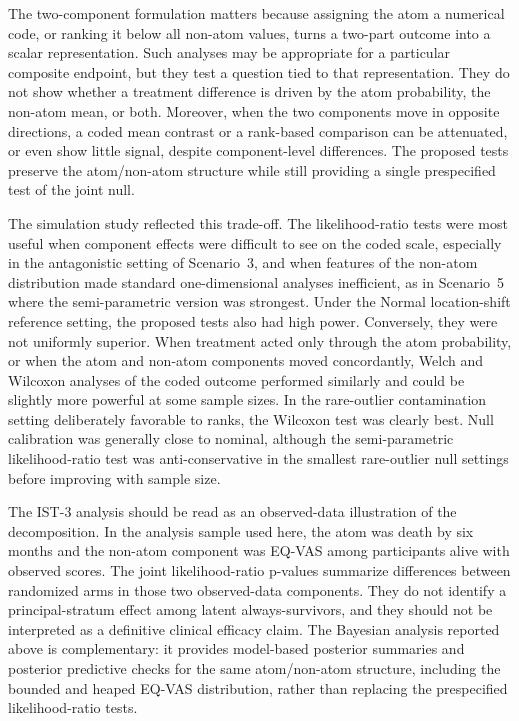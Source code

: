 \documentclass[11pt]{article}
\begin{document}
The two-component formulation matters because assigning the atom a numerical code, or ranking it below all non-atom values, turns a two-part outcome into a scalar representation. Such analyses may be appropriate for a particular composite endpoint, but they test a question tied to that representation. They do not show whether a treatment difference is driven by the atom probability, the non-atom mean, or both. Moreover, when the two components move in opposite directions, a coded mean contrast or a rank-based comparison can be attenuated, or even show little signal, despite component-level differences. The proposed tests preserve the atom/non-atom structure while still providing a single prespecified test of the joint null.

The simulation study reflected this trade-off. The likelihood-ratio tests were most useful when component effects were difficult to see on the coded scale, especially in the antagonistic setting of Scenario~3, and when features of the non-atom distribution made standard one-dimensional analyses inefficient, as in Scenario~5 where the semi-parametric version was strongest. Under the Normal location-shift reference setting, the proposed tests also had high power. Conversely, they were not uniformly superior. When treatment acted only through the atom probability, or when the atom and non-atom components moved concordantly, Welch and Wilcoxon analyses of the coded outcome performed similarly and could be slightly more powerful at some sample sizes. In the rare-outlier contamination setting deliberately favorable to ranks, the Wilcoxon test was clearly best. Null calibration was generally close to nominal, although the semi-parametric likelihood-ratio test was anti-conservative in the smallest rare-outlier null settings before improving with sample size.

The IST-3 analysis should be read as an observed-data illustration of the decomposition. In the analysis sample used here, the atom was death by six months and the non-atom component was EQ-VAS among participants alive with observed scores. The joint likelihood-ratio p-values summarize differences between randomized arms in those two observed-data components. They do not identify a principal-stratum effect among latent always-survivors, and they should not be interpreted as a definitive clinical efficacy claim. The Bayesian analysis reported above is complementary: it provides model-based posterior summaries and posterior predictive checks for the same atom/non-atom structure, including the bounded and heaped EQ-VAS distribution, rather than replacing the prespecified likelihood-ratio tests.
\end{document}
